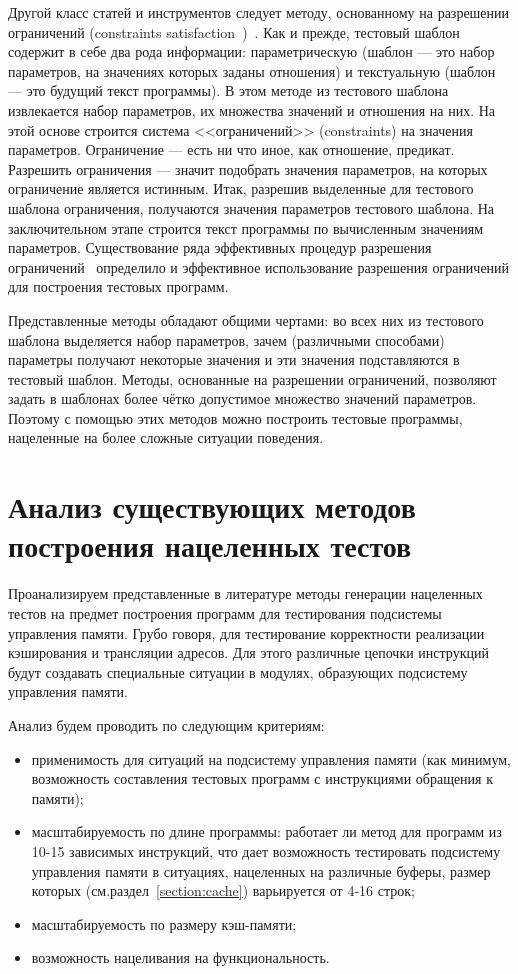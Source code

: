 \documentclass[14pt]{extreport}
\begin{document}
Другой класс статей и инструментов следует методу, основанному на разрешении ограничений (constraints satisfaction~\cite{CLPusingECLiPSe})~\cite{GenesysPro, GenesysPro2004Innovations, DeepTrans, RAVEN, MAATG}. Как и прежде, тестовый шаблон содержит в себе два рода информации: параметрическую (шаблон --- это набор параметров, на значениях которых заданы отношения) и текстуальную (шаблон --- это будущий текст программы). В этом методе из тестового шаблона извлекается набор параметров, их множества значений и отношения на них. На этой основе строится система <<ограничений>> (constraints) на значения параметров. Ограничение --- есть ни что иное, как отношение, предикат. Разрешить ограничения --- значит подобрать значения параметров, на которых ограничение является истинным. Итак, разрешив выделенные для тестового шаблона ограничения, получаются значения параметров тестового шаблона. На заключительном этапе строится текст программы по вычисленным значениям параметров. Существование ряда эффективных процедур разрешения ограничений~\cite{CLPusingECLiPSe, SMT} определило и эффективное использование разрешения ограничений для построения тестовых программ.

Представленные методы обладают общими чертами: во всех них из тестового шаблона выделяется набор параметров, зачем (различными способами) параметры получают некоторые значения и эти значения подставляются в тестовый шаблон. Методы, основанные на разрешении ограничений, позволяют задать в шаблонах более чётко допустимое множество значений параметров. Поэтому с помощью этих методов можно построить тестовые программы, нацеленные на более сложные ситуации поведения.

\section{Анализ существующих методов построения нацеленных тестов}

Проанализируем представленные в литературе методы генерации нацеленных тестов на предмет построения программ для тестирования подсистемы управления памяти. Грубо говоря, для тестирование корректности реализации кэширования и трансляции адресов. Для этого различные цепочки инструкций будут создавать специальные ситуации в модулях, образующих подсистему управления памяти.

Анализ будем проводить по следующим критериям:
\begin{itemize}
	\item применимость для ситуаций на подсистему управления памяти (как минимум, возможность составления тестовых программ с инструкциями обращения к памяти);
	\item масштабируемость по длине программы: работает ли метод для программ из 10-15 зависимых инструкций, что дает возможность тестировать подсистему управления памяти в ситуациях, нацеленных на различные буферы, размер которых (см.раздел~\ref{section:cache}) варьируется от 4-16 строк;
	\item масштабируемость по размеру кэш-памяти;
	\item возможность нацеливания на функциональность.
\end{itemize}
\end{document}
